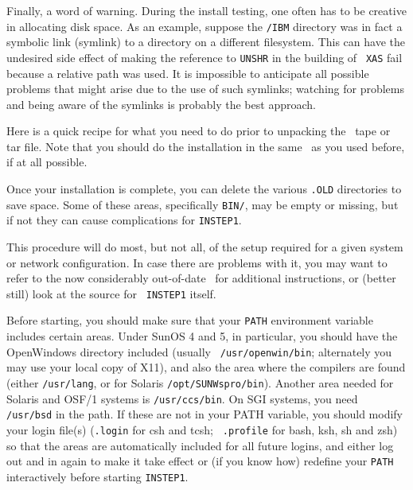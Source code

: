 Finally, a word of warning.  During the install testing, one often has
to be creative in allocating disk space.  As an example, suppose the
{\tt \THISVER/IBM} directory was in fact a symbolic link (symlink) to a
directory on a different filesystem.  This can have the undesired side
effect of making the reference to {\tt UNSHR} in the building of {\tt
XAS} fail because a relative path was used.  It is impossible to
anticipate all possible problems that might arise due to the use of such
symlinks; watching for problems and being aware of the symlinks is
probably the best approach.

\medskip{}

Here is a quick recipe for what you need to do prior to unpacking the
\THISVER\ tape or tar file.  Note that you should do the installation in
the same \AROOT\ as you used before, if at all possible.\medskip

\medskip

\noindent Once your installation is complete, you can delete the various
{\tt .OLD} directories to save space.  Some of these areas, specifically
{\tt BIN/\ARCH}, may be empty or missing, but if not they can cause
complications for {\tt INSTEP1}.

\medskip{}

This procedure will do most, but not all, of the setup required for a
given system or network configuration.  In case there are problems with
it, you may want to refer to the now considerably out-of-date \BOH\ for
additional instructions, or (better still) look at the source for {\tt
INSTEP1} itself.

Before starting, you should make sure that your {\tt PATH} environment
variable includes certain areas.  Under SunOS 4 and 5, in particular,
you should have the OpenWindows directory included (usually {\tt
/usr/openwin/bin}; alternately you may use your local copy of X11), and
also the area where the compilers are found (either {\tt /usr/lang}, or
for Solaris {\tt /opt/SUNWspro/bin}).  Another area needed for Solaris
and OSF/1 systems is {\tt /usr/ccs/bin}.  On SGI systems, you need {\tt
/usr/bsd} in the path.  If these are not in your PATH variable, you
should modify your login file(s) ({\tt .login} for csh and tcsh; {\tt
.profile} for bash, ksh, sh and zsh) so that the areas are automatically
included for all future logins, and either log out and in again to make
it take effect or (if you know how) redefine your {\tt PATH}
interactively before starting {\tt INSTEP1}.

